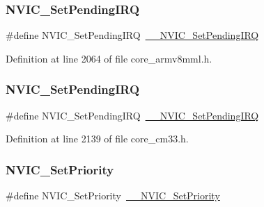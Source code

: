 \subsubsection{\texorpdfstring{N\+V\+I\+C\+\_\+\+Set\+Pending\+I\+RQ}{NVIC\_SetPendingIRQ}\hspace{0.1cm}{\footnotesize\ttfamily [12/13]}}
{\footnotesize\ttfamily \#define N\+V\+I\+C\+\_\+\+Set\+Pending\+I\+RQ~\hyperlink{group___c_m_s_i_s___core___n_v_i_c_functions_gaabefdd4b790b9a7308929938c0c1e1ad}{\+\_\+\+\_\+\+N\+V\+I\+C\+\_\+\+Set\+Pending\+I\+RQ}}



Definition at line 2064 of file core\+\_\+armv8mml.\+h.

\mbox{\label{group___c_m_s_i_s___core___n_v_i_c_functions_ga2b47e2e52cf5c48a5c3348636434b3ac}} 
\subsubsection{\texorpdfstring{N\+V\+I\+C\+\_\+\+Set\+Pending\+I\+RQ}{NVIC\_SetPendingIRQ}\hspace{0.1cm}{\footnotesize\ttfamily [13/13]}}
{\footnotesize\ttfamily \#define N\+V\+I\+C\+\_\+\+Set\+Pending\+I\+RQ~\hyperlink{group___c_m_s_i_s___core___n_v_i_c_functions_gaabefdd4b790b9a7308929938c0c1e1ad}{\+\_\+\+\_\+\+N\+V\+I\+C\+\_\+\+Set\+Pending\+I\+RQ}}



Definition at line 2139 of file core\+\_\+cm33.\+h.

\mbox{\label{group___c_m_s_i_s___core___n_v_i_c_functions_gae0e9d0e2f7b6133828c71b57d4941c35}} 
\subsubsection{\texorpdfstring{N\+V\+I\+C\+\_\+\+Set\+Priority}{NVIC\_SetPriority}\hspace{0.1cm}{\footnotesize\ttfamily [1/13]}}
{\footnotesize\ttfamily \#define N\+V\+I\+C\+\_\+\+Set\+Priority~\hyperlink{group___c_m_s_i_s___core___n_v_i_c_functions_ga505338e23563a9c074910fb14e7d45fd}{\+\_\+\+\_\+\+N\+V\+I\+C\+\_\+\+Set\+Priority}}



